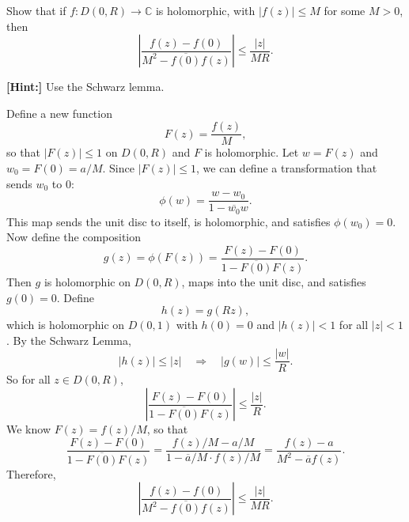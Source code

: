 \documentclass[12pt]{article}
\begin{document}
\begin{statement}[8.5.11]
    Show that if $f : D(0, R) \to \mathbb{C}$ is holomorphic, with $|f(z)| \leq M$ for some $M > 0$, then
        $$ \left| \frac{f(z) - f(0)}{M^2 - \overline{f(0)} f(z)} \right| \leq \frac{|z|}{MR}. $$
    \par \textbf{[Hint:]} Use the Schwarz lemma.
\end{statement}
\begin{newproof}
    Define a new function
    $$ F(z) = \frac{f(z)}{M}, $$
    so that $|F(z)| \leq 1$ on $D(0, R)$ and $F$ is holomorphic.
    Let $w = F(z)$ and $w_0 = F(0) = a/M$. Since $|F(z)| \leq 1$, we can define a transformation that sends $w_0$ to $0$:
    $$ \phi(w) = \frac{w - w_0}{1 - \overline{w_0} w}. $$
    This map sends the unit disc to itself, is holomorphic, and satisfies $\phi(w_0) = 0$. Now define the composition
    $$ g(z) = \phi(F(z)) = \frac{F(z) - F(0)}{1 - \overline{F(0)} F(z)}. $$
    Then $g$ is holomorphic on $D(0, R)$, maps into the unit disc, and satisfies $g(0) = 0$. Define
    $$ h(z) = g(Rz), $$
    which is holomorphic on $D(0, 1)$ with $h(0) = 0$ and $|h(z)| < 1$ for all $|z| < 1$. By the Schwarz Lemma,
    $$ |h(z)| \leq |z| \quad \Rightarrow \quad |g(w)| \leq \frac{|w|}{R}. $$
    So for all $z \in D(0, R)$,
    $$ \left| \frac{F(z) - F(0)}{1 - \overline{F(0)} F(z)} \right| \leq \frac{|z|}{R}. $$
    We know $F(z) = f(z)/M$, so that
    $$ \frac{F(z) - F(0)}{1 - \overline{F(0)} F(z)} = \frac{f(z)/M - a/M}{1 - \overline{a}/M \cdot f(z)/M} = \frac{f(z) - a}{M^2 - \overline{a} f(z)}. $$
    Therefore,
    $$ \left| \frac{f(z) - f(0)}{M^2 - \overline{f(0)} f(z)} \right| \leq \frac{|z|}{MR}. $$
\end{newproof}

\newpage
\end{document}
